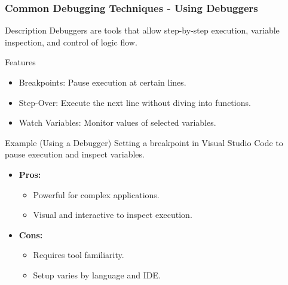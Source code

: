 \documentclass{beamer}
\begin{document}
\begin{frame}[fragile]
    \frametitle{Common Debugging Techniques - Using Debuggers}
    \begin{block}{Description}
        Debuggers are tools that allow step-by-step execution, variable inspection, and control of logic flow.
    \end{block}
    
    \begin{block}{Features}
        \begin{itemize}
            \item Breakpoints: Pause execution at certain lines.
            \item Step-Over: Execute the next line without diving into functions.
            \item Watch Variables: Monitor values of selected variables.
        \end{itemize}
    \end{block}

    \begin{block}{Example (Using a Debugger)}
        Setting a breakpoint in Visual Studio Code to pause execution and inspect variables.
    \end{block}

    \begin{itemize}
        \item \textbf{Pros:}
        \begin{itemize}
            \item Powerful for complex applications.
            \item Visual and interactive to inspect execution.
        \end{itemize}
        \item \textbf{Cons:}
        \begin{itemize}
            \item Requires tool familiarity.
            \item Setup varies by language and IDE.
        \end{itemize}
    \end{itemize}
\end{frame}
\end{document}
